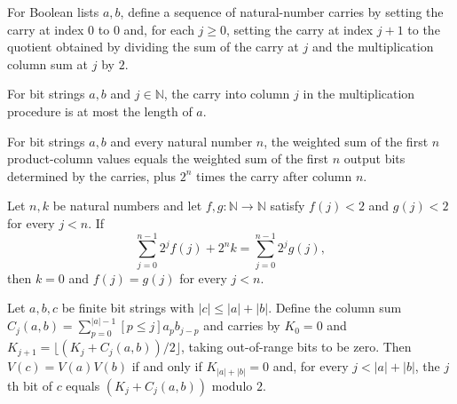 \begin{definition}
\label{Complexity.multCarry}
\leanok
{}
For Boolean lists $a,b$, define a sequence of natural-number carries by setting the
carry at index $0$ to $0$ and, for each $j\ge 0$, setting the carry at index $j+1$ to
the quotient obtained by dividing the sum of the carry at $j$ and the multiplication
column sum at $j$ by $2$.
\end{definition}

\begin{lemma}
\label{Complexity.multCarry_le}
\leanok
{}
For bit strings $a,b$ and $j\in\mathbb{N}$, the carry into column $j$ in the
multiplication procedure is at most the length of $a$.
\end{lemma}

\begin{lemma}
\label{Complexity.mult_carry_invariant}
\leanok
{}
For bit strings $a,b$ and every natural number $n$, the weighted sum of the first $n$
product-column values equals the weighted sum of the first $n$ output bits determined by
the carries, plus $2^n$ times the carry after column $n$.
\end{lemma}

\begin{lemma}
\label{Complexity.mult_digits_unique}
\leanok
{}
Let $n,k$ be natural numbers and let $f,g:\mathbb N\to\mathbb N$ satisfy $f(j)<2$ and
$g(j)<2$ for every $j<n$. If
\[\sum_{j=0}^{n-1}2^j f(j)+2^n k=\sum_{j=0}^{n-1}2^j g(j),\]
then $k=0$ and $f(j)=g(j)$ for every $j<n$.
\end{lemma}

\begin{lemma}
\label{Complexity.mult_columns_correct}
\leanok
{}
Let $a,b,c$ be finite bit strings with $|c|\le |a|+|b|$. Define the column sum
$C_j(a,b)=\sum_{p=0}^{|a|-1}[p\le j]a_p b_{j-p}$ and carries by $K_0=0$ and
$K_{j+1}=\lfloor(K_j+C_j(a,b))/2\rfloor$, taking out-of-range bits to be zero. Then
$V(c)=V(a)V(b)$ if and only if $K_{|a|+|b|}=0$ and, for every $j<|a|+|b|$, the $j$th bit
of $c$ equals $(K_j+C_j(a,b))$ modulo $2$.
\end{lemma}

